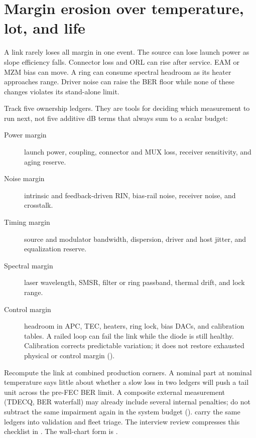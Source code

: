 \section{Margin erosion over temperature, lot, and life}
\label{sec:laser-margin-erosion}

A link rarely loses all margin in one event. The source can lose launch power as
slope efficiency falls. Connector loss and ORL can rise after service. EAM or
MZM bias can move. A ring can consume spectral headroom as its heater approaches
range. Driver noise can raise the BER floor while none of these changes violates
its stand-alone limit.

Track five ownership ledgers. They are tools for deciding which measurement to
run next, not five additive dB terms that always sum to a scalar budget:
\begin{description}
\item[Power margin] launch power, coupling, connector and MUX loss, receiver
      sensitivity, and aging reserve.
\item[Noise margin] intrinsic and feedback-driven RIN, bias-rail noise, receiver
      noise, and crosstalk.
\item[Timing margin] source and modulator bandwidth, dispersion, driver and host
      jitter, and equalization reserve.
\item[Spectral margin] laser wavelength, SMSR, filter or ring passband, thermal
      drift, and lock range.
\item[Control margin] headroom in APC, TEC, heaters, ring lock, bias DACs, and
      calibration tables. A railed loop can fail the link while the diode is
      still healthy. Calibration corrects predictable variation; it does not
      restore exhausted physical or control margin
      ().
\end{description}

Recompute the link at combined production corners. A nominal part at nominal
temperature says little about whether a slow loss in two ledgers will push a
tail unit across the pre-FEC BER limit. A composite external measurement
(TDECQ, BER waterfall) may already include several internal penalties; do not
subtract the same impairment again in the system budget
().  carry the
same ledgers into validation and fleet triage. The interview review compresses
this checklist in . The wall-chart form is
.

